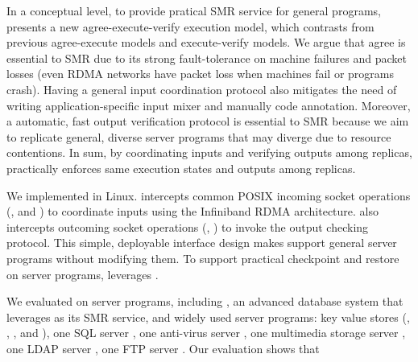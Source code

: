 In a conceptual level, to provide pratical SMR service for general programs, 
\xxx presents a new agree-execute-verify execution model, which contrasts from 
previous agree-execute models and execute-verify models. We argue that agree is 
essential to SMR due to its strong fault-tolerance on machine failures and 
packet losses (even RDMA networks have packet loss when machines fail or 
programs crash). Having a general input coordination protocol also mitigates 
the need of writing application-specific input mixer and manually code 
annotation. Moreover, a automatic, fast output verification protocol is 
essential to SMR because we aim to replicate general, diverse server programs 
that may diverge due to resource contentions. In sum, by coordinating inputs 
and verifying outputs among replicas, \xxx practically enforces same execution 
states and outputs among replicas.

We implemented \xxx in Linux. \xxx intercepts common POSIX incoming socket 
operations (\eg, \accept and \recv) to coordinate inputs using the Infiniband 
RDMA architecture. \xxx also intercepts outcoming socket operations (\eg, 
\send) to invoke the output checking protocol. This simple, deployable 
interface design makes \xxx support general server programs without modifying 
them. To support practical checkpoint and restore on server 
programs, \xxx leverages \criu.

We evaluated \xxx on \nprog server programs, including \calvin, an advanced 
database system that leverages \zookeeper as its SMR service, and \npopularprog 
widely used server programs: \nkvprog key value stores (\redis, 
\memcached, \ssdb, and \mongodb), one SQL server \mysql, one anti-virus server 
\clamav, one multimedia storage server \mediatomb, one LDAP server \openldap, 
one FTP server \tftp. Our evaluation shows that

